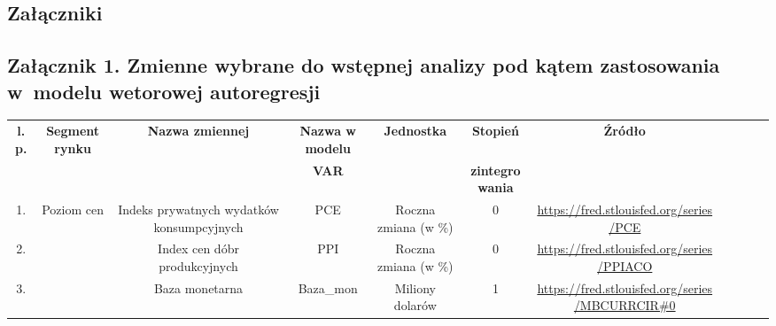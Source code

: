 \titlespacing*{\chapter}{0pt}{-80mm}{40pt} %

\begin{landscape} %
\chapter*{Załączniki}
\vspace{-1cm}
\section*{{\large Załącznik 1. Zmienne wybrane do wstępnej analizy pod kątem zastosowania w~modelu wetorowej autoregresji}}
\vspace{-0.5cm}
\hypertarget{zal1}{}
\begin{table}[h]
\centering
\tiny
\begin{tabular}{|c|c|c|c|c|c|c|llll}
\cline{1-7}
\multirow{2}{*}{\textbf{l.p.}} & \multirow{2}{*}{\textbf{Segment rynku}} & \multirow{2}{*}{\textbf{Nazwa zmiennej}} & \textbf{Nazwa w modelu} & \multirow{2}{*}{\textbf{Jednostka}} & \textbf{Stopień}  & \multirow{2}{*}{\textbf{Źródło}} &  &  &  &  \\ 
 &  &  & \textbf{VAR} & & \textbf{zintegrowania} &  &  &  &  &  \\
\cline{1-7}
1. & \multirow{5}{*}{Poziom cen} & Indeks prywatnych wydatków konsumpcyjnych & PCE & Roczna zmiana (w \%) & 0 & \url{https://fred.stlouisfed.org/series/PCE} &  &  &  &  \\ \cline{1-1} \cline{3-7}
2.            &                                                  & Index cen dóbr produkcyjnych & PPI                              & Roczna zmiana (w \%) & 0 & \url{https://fred.stlouisfed.org/series/PPIACO}            &  &  &  &  \\ \cline{1-1} \cline{3-7}
3.            &                                                  & 
Baza monetarna & Baza\_mon                        & Miliony dolarów &  1   & \url{https://fred.stlouisfed.org/series/MBCURRCIR\#0}      &  &  &  &  \\ \cline{1-1} \cline{3-7}

\end{tabular}
\end{table}
\end{landscape}
